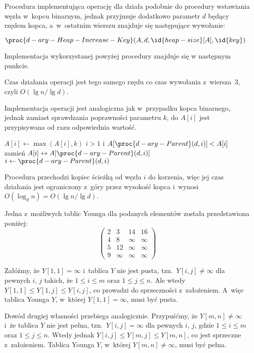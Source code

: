 \subproblem %
Procedura  implementująca operację  dla  działa podobnie do procedury wstawiania węzła w~kopcu binarnym, jednak przyjmuje dodatkowo parametr $d$ będący rzędem kopca, a~w~ostatnim wierszu znajduje się następujące wywołanie:
\begin{codebox}
\setcounter{codelinenumber}{2}
\li	$\proc{d-ary-Heap-Increase-Key}(A,d,\id{heap-size}[A],\id{key})$
\end{codebox}
Implementacja wykorzystanej powyżej procedury znajduje się w następnym punkcie.

Czas działania operacji  jest tego samego rzędu co czas wywołania z~wiersza~3, czyli $O(\lg n/\!\lg d)$.

\subproblem %
Implementacja operacji jest analogiczna jak w~przypadku kopca binarnego, jednak zamiast sprawdzania poprawności parametru $k$, do $A[i]$ jest przypisywana od razu odpowiednia wartość.
\begin{codebox}
\li	$A[i]\gets\max(A[i],k)$
\li	\While $i>1$ i $A[\proc{d-ary-Parent}(d,i)]<A[i]$
\li		\Do
			zamień $A[i]\leftrightarrow A[\proc{d-ary-Parent}(d,i)]$
\li			$i\gets\proc{d-ary-Parent}(d,i)$
		\End
\end{codebox}
Procedura przechodzi kopiec ścieżką od węzła $i$ do korzenia, więc jej czas działania jest ograniczony z~góry przez wysokość kopca i~wynosi $O(\log_dn)=O(\lg n/\!\lg d)$.


\subproblem %
Jedna z~możliwych tablic Younga dla podanych elementów została przedstawiona poniżej:
\[
	\begin{pmatrix}
		2 & 3 & 14 & 16 \\
		4 & 8 & \infty & \infty \\
		5 & 12 & \infty & \infty \\
		9 & \infty& \infty & \infty
	\end{pmatrix}
\]

\subproblem %
Załóżmy, że $Y[1,1]=\infty$ i~tablica $Y$ nie jest pusta, tzn.\ $Y[i,j]\ne\infty$ dla pewnych $i$, $j$ takich, że $1\le i\le m$ oraz $1\le j\le n$. Ale wtedy $Y[1,1]\le Y[1,j]\le Y[i,j]$, co prowadzi do sprzeczności z~założeniem. A~więc tablica Younga $Y$, w~której $Y[1,1]=\infty$, musi być pusta.

Dowód drugiej własności przebiega analogicznie. Przypuśćmy, że $Y[m,n]\ne\infty$ i~że tablica $Y$ nie jest pełna, tzn.\ $Y[i,j]=\infty$ dla pewnych $i$, $j$, gdzie $1\le i\le m$ oraz $1\le j\le n$. Wtedy jednak $Y[i,j]\le Y[m,j]\le Y[m,n]$, co jest sprzeczne z~założeniem. Tablica Younga $Y$, w~której $Y[m,n]\ne\infty$, musi być pełna.


